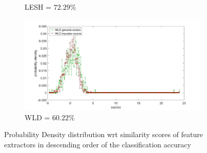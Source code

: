 \documentclass[english, 12pt]{article}
\begin{document}
\begin{figure}[H]
\begin{subfigure}[b]{0.44\textwidth}
        \caption{LESH = $72.29\%$}
        \label{fig:LESH}
    \end{subfigure}
    \begin{subfigure}[b]{0.44\textwidth}
        \includegraphics[width=\textwidth]{WLD1.jpg}
        \caption{WLD = $60.22\%$}
        \label{fig:WLD}
    \end{subfigure}
    \centering
    \caption{ Probability Density distribution wrt similarity scores of feature extractors in descending order of the classification accuracy}\label{fig:pds}
\end{figure}
\end{document}
